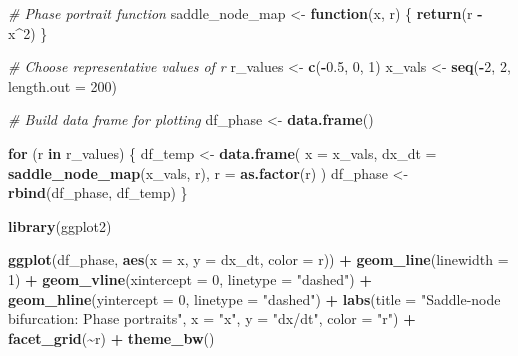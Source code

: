 \documentclass[
]{article}
\newenvironment{Shaded}{\begin{snugshade}}{\end{snugshade}}
\newcommand{\AttributeTok}[1]{\textcolor[rgb]{0.13,0.29,0.53}{#1}}
\newcommand{\CommentTok}[1]{\textcolor[rgb]{0.56,0.35,0.01}{\textit{#1}}}
\newcommand{\ControlFlowTok}[1]{\textcolor[rgb]{0.13,0.29,0.53}{\textbf{#1}}}
\newcommand{\DecValTok}[1]{\textcolor[rgb]{0.00,0.00,0.81}{#1}}
\newcommand{\FloatTok}[1]{\textcolor[rgb]{0.00,0.00,0.81}{#1}}
\newcommand{\FunctionTok}[1]{\textcolor[rgb]{0.13,0.29,0.53}{\textbf{#1}}}
\newcommand{\NormalTok}[1]{#1}
\newcommand{\OtherTok}[1]{\textcolor[rgb]{0.56,0.35,0.01}{#1}}
\newcommand{\SpecialCharTok}[1]{\textcolor[rgb]{0.81,0.36,0.00}{\textbf{#1}}}
\newcommand{\StringTok}[1]{\textcolor[rgb]{0.31,0.60,0.02}{#1}}
\begin{document}
\begin{Shaded}
\begin{Highlighting}[]
\CommentTok{\# Phase portrait function}
\NormalTok{saddle\_node\_map }\OtherTok{\textless{}{-}} \ControlFlowTok{function}\NormalTok{(x, r) \{}
  \FunctionTok{return}\NormalTok{(r }\SpecialCharTok{{-}}\NormalTok{ x}\SpecialCharTok{\^{}}\DecValTok{2}\NormalTok{)}
\NormalTok{\}}

\CommentTok{\# Choose representative values of r}
\NormalTok{r\_values }\OtherTok{\textless{}{-}} \FunctionTok{c}\NormalTok{(}\SpecialCharTok{{-}}\FloatTok{0.5}\NormalTok{, }\DecValTok{0}\NormalTok{, }\DecValTok{1}\NormalTok{)}
\NormalTok{x\_vals }\OtherTok{\textless{}{-}} \FunctionTok{seq}\NormalTok{(}\SpecialCharTok{{-}}\DecValTok{2}\NormalTok{, }\DecValTok{2}\NormalTok{, }\AttributeTok{length.out =} \DecValTok{200}\NormalTok{)}

\CommentTok{\# Build data frame for plotting}
\NormalTok{df\_phase }\OtherTok{\textless{}{-}} \FunctionTok{data.frame}\NormalTok{()}

\ControlFlowTok{for}\NormalTok{ (r }\ControlFlowTok{in}\NormalTok{ r\_values) \{}
\NormalTok{  df\_temp }\OtherTok{\textless{}{-}} \FunctionTok{data.frame}\NormalTok{(}
    \AttributeTok{x =}\NormalTok{ x\_vals,}
    \AttributeTok{dx\_dt =} \FunctionTok{saddle\_node\_map}\NormalTok{(x\_vals, r),}
    \AttributeTok{r =} \FunctionTok{as.factor}\NormalTok{(r)}
\NormalTok{  )}
\NormalTok{  df\_phase }\OtherTok{\textless{}{-}} \FunctionTok{rbind}\NormalTok{(df\_phase, df\_temp)}
\NormalTok{\}}

\FunctionTok{library}\NormalTok{(ggplot2)}

\FunctionTok{ggplot}\NormalTok{(df\_phase, }\FunctionTok{aes}\NormalTok{(}\AttributeTok{x =}\NormalTok{ x, }\AttributeTok{y =}\NormalTok{ dx\_dt, }\AttributeTok{color =}\NormalTok{ r)) }\SpecialCharTok{+}
  \FunctionTok{geom\_line}\NormalTok{(}\AttributeTok{linewidth =} \DecValTok{1}\NormalTok{) }\SpecialCharTok{+}
  \FunctionTok{geom\_vline}\NormalTok{(}\AttributeTok{xintercept =} \DecValTok{0}\NormalTok{, }\AttributeTok{linetype =} \StringTok{"dashed"}\NormalTok{) }\SpecialCharTok{+}
  \FunctionTok{geom\_hline}\NormalTok{(}\AttributeTok{yintercept =} \DecValTok{0}\NormalTok{, }\AttributeTok{linetype =} \StringTok{"dashed"}\NormalTok{) }\SpecialCharTok{+}
  \FunctionTok{labs}\NormalTok{(}\AttributeTok{title =} \StringTok{"Saddle{-}node bifurcation: Phase portraits"}\NormalTok{,}
       \AttributeTok{x =} \StringTok{"x"}\NormalTok{, }\AttributeTok{y =} \StringTok{"dx/dt"}\NormalTok{, }\AttributeTok{color =} \StringTok{"r"}\NormalTok{) }\SpecialCharTok{+}
  \FunctionTok{facet\_grid}\NormalTok{(}\SpecialCharTok{\textasciitilde{}}\NormalTok{r) }\SpecialCharTok{+}
  \FunctionTok{theme\_bw}\NormalTok{()}
\end{Highlighting}
\end{Shaded}
\end{document}

